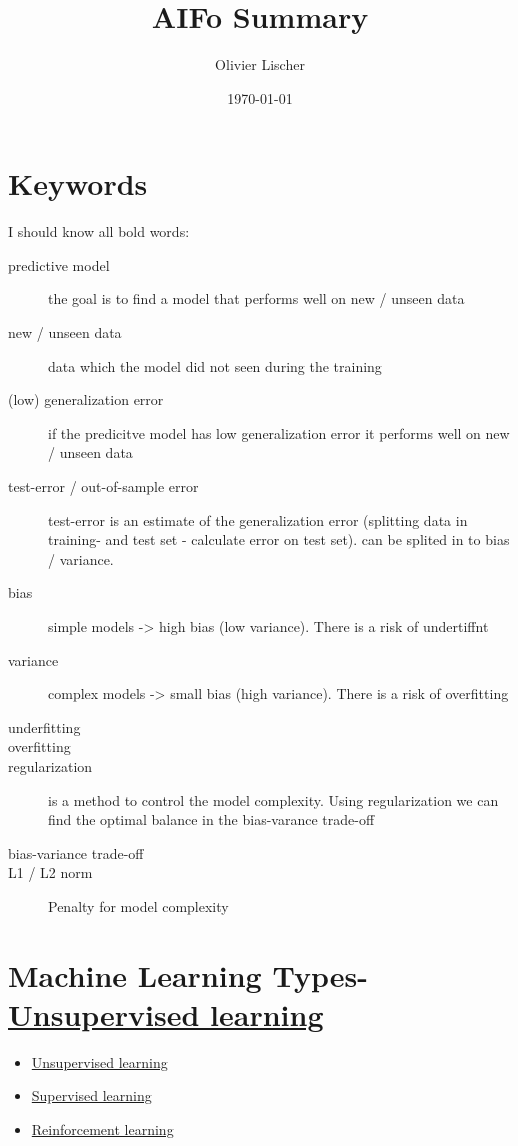 \documentclass[11pt,twoside,landscape]{article}
\author{Olivier Lischer}
\date{\today}
\title{AIFo Summary}
\begin{document}
\begin{multicols}{3}

\section{Keywords}
\label{sec:org62a3675}
I should know all bold words:

\begin{description}
\item[{predictive model}] the goal is to find a model that performs well on new / unseen data
\item[{new / unseen data}] data which the model did not seen during the training
\item[{(low) generalization error}] if the predicitve model has low generalization error it performs well on new / unseen data
\item[{test-error / out-of-sample error}] test-error is an estimate of the generalization error (splitting data in training- and test set - calculate error on test set). can be splited in to bias / variance.
\item[{bias}] simple models -> high bias (low variance). There is a risk of undertiffnt
\item[{variance}] complex models -> small bias (high variance). There is a risk of overfitting
\item[{underfitting}] 

\item[{overfitting}] 

\item[{regularization}] is a method to control the model complexity. Using regularization we can find the optimal balance in the bias-varance trade-off
\item[{bias-variance trade-off}] 

\item[{L1 / L2 norm}] Penalty for model complexity
\end{description}

\section{Machine Learning Types- \href{../../../roam/20210924090800-unsupervised_learning.org}{Unsupervised learning}}
\label{sec:org6a98c18}
\begin{itemize}
\item \href{../../../roam/20210924090800-unsupervised_learning.org}{Unsupervised learning}
\item \href{../../../roam/20210924091334-supervised_learning.org}{Supervised learning}
\item \href{../../../roam/20210924091935-reinforcement_learning.org}{Reinforcement learning}
\end{itemize}


\end{multicols}
\end{document}
